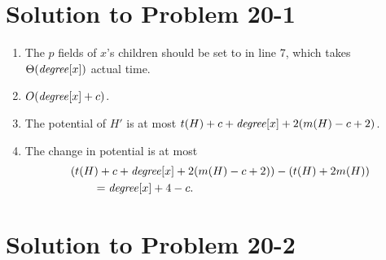 \documentclass[a4paper, fleqn]{article}
\begin{document}
\section*{Solution to Problem 20-1}

\begin{enumerate}
\renewcommand{\labelenumi}{\itshape \bfseries \alph{enumi}.}

\item  %

The $p$ fields of $x$'s children should be set to  in line
7, which takes $\Theta(\id{degree}[x])$ actual time.

\item  %

$O(\id{degree}[x] + c)$.

\item  %

The potential of $H'$ is at most $t(H) + c + \id{degree}[x] + 2(m(H) -
c + 2)$.

\item  %

The change in potential is at most
\begin{align*}
&(t(H) + c + \id{degree}[x] + 2(m(H) - c + 2)) - (t(H) + 2m(H)) \\
&\qquad = \id{degree}[x] + 4 - c.
\end{align*}

\end{enumerate}






\section*{Solution to Problem 20-2}
\end{document}
